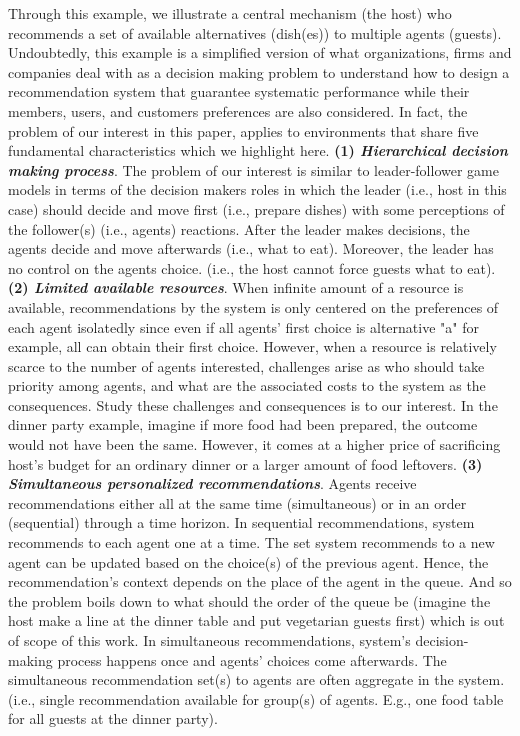 \documentclass[11pt, letterpaper]{article}
\begin{document}
Through this example, we illustrate a central mechanism (the host) who recommends a set of available alternatives (dish(es)) to multiple agents (guests). Undoubtedly, this example is a simplified version of what organizations, firms and companies deal with as a decision making problem to understand how to design a recommendation system that guarantee systematic performance while their members, users, and customers preferences are also considered. In fact, the problem of our interest in this paper, applies to environments that share five fundamental characteristics which we highlight here. \textbf{(1) \emph{Hierarchical decision making process}}. The problem of our interest is similar to leader-follower game models in terms of the decision makers roles in which the leader (i.e., host in this case) should decide and move first (i.e., prepare dishes) with some perceptions of the follower(s) (i.e., agents) reactions. After the leader makes decisions, the agents decide and move afterwards (i.e., what to eat). Moreover, the leader has no control on the agents choice. (i.e., the host cannot force guests what to eat). \textbf{(2) \emph{Limited available resources}}. When infinite amount of a resource is available, recommendations by the system is only centered on the preferences of each agent isolatedly since even if all agents' first choice is alternative "a" for example, all can obtain their first choice. However, when a resource is relatively scarce to the number of agents interested, challenges arise as who should take priority among agents, and what are the associated costs to the system as the consequences. Study these challenges and consequences is to our interest. 
In the dinner party example, imagine if more food had been prepared, the outcome would not have been the same. However, it comes at a higher price of sacrificing host's budget for an ordinary dinner or a larger amount of food leftovers. \textbf{(3) \emph{Simultaneous personalized recommendations}}. Agents receive recommendations either all at the same time (simultaneous) or in an order (sequential) through a time horizon. In sequential recommendations, system recommends to each agent one at a time. The set system recommends to a new agent can be updated based on the choice(s) of the previous agent. Hence, the recommendation's context depends on the place of the agent in the queue. And so the problem boils down to what should the order of the queue be (imagine the host make a line at the dinner table and put vegetarian guests first) which is out of scope of this work. 
In simultaneous recommendations, system's decision-making process happens once and agents' choices come afterwards. The simultaneous recommendation set(s) to agents are often aggregate in the system. (i.e., single recommendation available for group(s) of agents. E.g., one food table for all guests at the dinner party).
\end{document}
